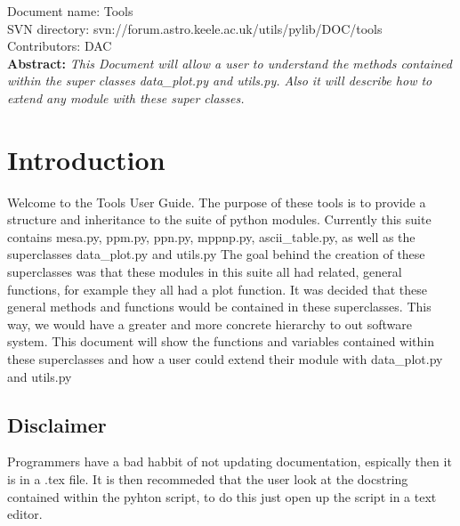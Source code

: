 \renewcommand{\ndoctitle}{data\_plot.py and utils.py: A guide to using these superclasses} 
\renewcommand{\ndocname}{Tools}                      
\renewcommand{\svndir}{svn://forum.astro.keele.ac.uk/utils/pylib/DOC/tools}  
\renewcommand{\ndoccontribs}{DAC}



Document name: \ndocname \\
SVN directory: \svndir\\
Contributors: \ndoccontribs\\



{\textbf{Abstract:} \slshape
This Document will allow a user to understand the methods contained within the super classes
data\_plot.py and utils.py.  Also it will describe how to extend any module with 
these super classes.
}

\section{Introduction}
Welcome to the Tools User Guide.  The purpose of these tools is to provide a structure and inheritance to 
the suite of python modules. Currently this suite contains mesa.py, ppm.py, ppn.py, mppnp.py, ascii\_table.py, as well as the superclasses data\_plot.py and utils.py
The goal behind the creation of these superclasses was that these modules in this suite all had related, general functions, for example they all had a plot function.
It was decided that these general methods and functions would be contained in these superclasses.
This way, we would have a greater and more concrete hierarchy to out software system.
This document will show the functions and variables contained within these superclasses and how a user could extend their module with data\_plot.py and utils.py
\subsection{Disclaimer}
Programmers have a bad habbit of not updating documentation, espically then it is in  a .tex file.
It is then recommeded that the user look at the docstring contained within the pyhton script, to
do this just open up the script in a text editor.
